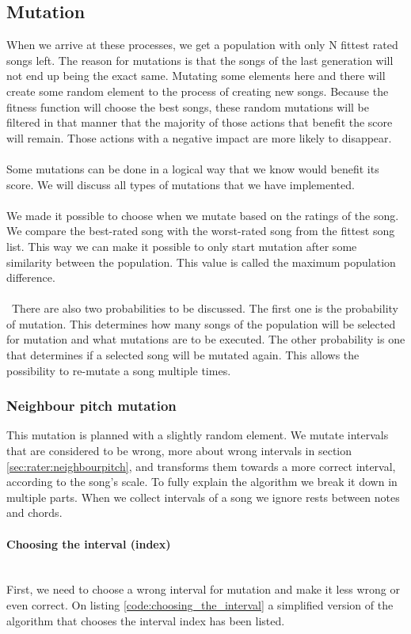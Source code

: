 \documentclass[a4paper]{article}
\begin{document}
\subsection{Mutation} \label{sec:mutation}
When we arrive at these processes, we get a population with only N fittest rated songs left. The reason for mutations is that the songs of the last generation will not end up being the exact same. Mutating some elements here and there will create some random element to the process of creating new songs. Because the fitness function will choose the best songs, these random mutations will be filtered in that manner that the majority of those actions that benefit the score will remain. Those actions with a negative impact are more likely to disappear. \\\\
Some mutations can be done in a logical way that we know would benefit its score. We will discuss all types of mutations that we have implemented.\\\\
We made it possible to choose when we mutate based on the ratings of the song. We compare the best-rated song with the worst-rated song from the fittest song list. This way we can make it possible to only start mutation after some similarity between the population. This value is called the maximum population difference.
\\\\\
There are also two probabilities to be discussed. The first one is the probability of mutation. This determines how many songs of the population will be selected for mutation and what mutations are to be executed. The other probability is one that determines if a selected song will be mutated again. This allows the possibility to re-mutate a song multiple times.
\subsubsection{Neighbour pitch mutation}
This mutation is planned with a slightly random element. We mutate intervals that are considered to be wrong, more about wrong intervals in section \ref{sec:rater:neighbourpitch}, and transforms them towards a more correct interval, according to the song's scale. To fully explain the algorithm we break it down in multiple parts. When we collect intervals of a song we ignore rests between notes and chords.
\paragraph{Choosing the interval (index)}\mbox{}\\
First, we need to choose a wrong interval for mutation and make it less wrong or even correct.
On listing \ref{code:choosing_the_interval} a simplified version of the algorithm that chooses the interval index has been listed. 
\end{document}
